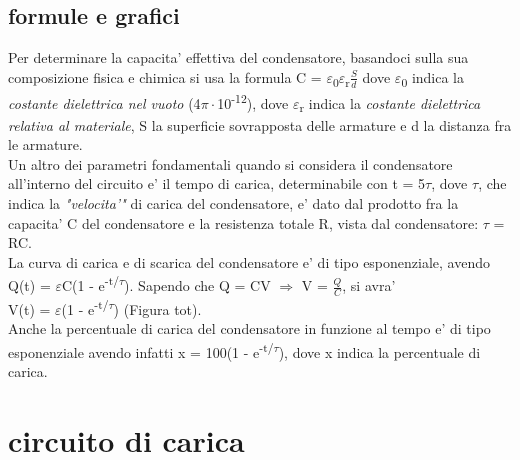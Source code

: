 \documentclass[12pt]{article}
\begin{document}
\subsection*{formule e grafici}
Per determinare la capacita' effettiva del condensatore, basandoci sulla sua composizione fisica e chimica si usa la formula 
C = $\varepsilon$\textsubscript{0}$\varepsilon$\textsubscript{r}$\frac{S}{d}$
dove $\varepsilon$\textsubscript{0} indica la 
\textit{costante dielettrica nel vuoto} (4$\pi\cdot$10\textsuperscript{-12}),
dove $\varepsilon$\textsubscript{r} indica la \textit{costante dielettrica relativa al materiale},
S la superficie sovrapposta delle armature e d la distanza fra le armature. \\

Un altro dei parametri fondamentali quando si considera il condensatore all'interno
del circuito e' il tempo di carica, determinabile con t = 5$\tau$, dove $\tau$, 
che indica la \textit{"velocita'"} di carica del condensatore, e' dato dal prodotto fra 
la capacita' C del condensatore e la resistenza totale R, vista dal condensatore: $\tau$ = RC. \\

La curva di carica e di scarica del condensatore e' di tipo esponenziale, avendo
Q(t) = $\varepsilon$C(1 - e\textsuperscript{-t/$\tau$}).
Sapendo che Q = CV $\Rightarrow$ V = $\frac{Q}{C}$, si avra' \\
V(t) = $\varepsilon$(1 - e\textsuperscript{-t/$\tau$}) (Figura tot). \\

Anche la percentuale di carica del condensatore in funzione al tempo e' di tipo esponenziale
avendo infatti x = 100(1 - e\textsuperscript{-t/$\tau$}), dove x indica la percentuale di carica.


\newpage

\section*{circuito di carica}
\end{document}

